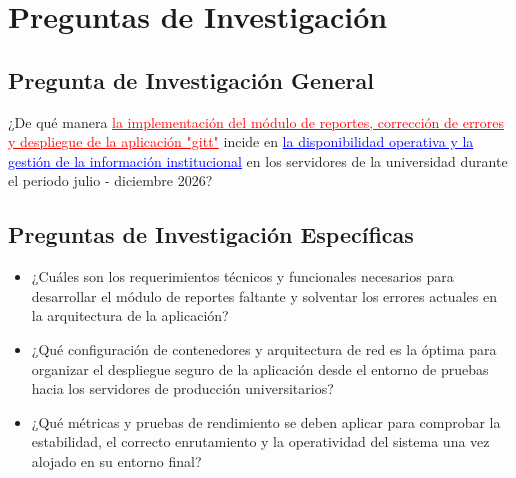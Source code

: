 
\section{Preguntas de Investigación}

\subsection{Pregunta de Investigación General}
¿De qué manera \textcolor{red}{\underline{la implementación del módulo de reportes, corrección de errores y despliegue de la aplicación "gitt"}} incide en \textcolor{blue}{\underline{la disponibilidad operativa y la gestión de la información institucional}} en los servidores de la universidad durante el periodo julio - diciembre 2026?

\subsection{Preguntas de Investigación Específicas}
\begin{itemize}
    \item ¿Cuáles son los requerimientos técnicos y funcionales necesarios para desarrollar el módulo de reportes faltante y solventar los errores actuales en la arquitectura de la aplicación?
    \item ¿Qué configuración de contenedores y arquitectura de red es la óptima para organizar el despliegue seguro de la aplicación desde el entorno de pruebas hacia los servidores de producción universitarios?
    \item ¿Qué métricas y pruebas de rendimiento se deben aplicar para comprobar la estabilidad, el correcto enrutamiento y la operatividad del sistema una vez alojado en su entorno final?
\end{itemize}